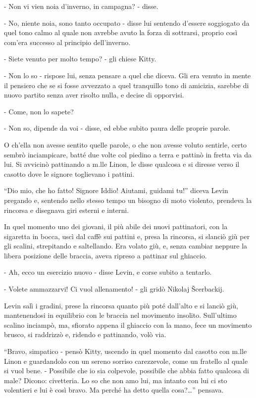- Non vi vien noia d'inverno, in campagna? - disse. 

- No, niente noia, sono tanto occupato - disse lui sentendo d'essere soggiogato da quel tono calmo al quale non avrebbe avuto la forza di sottrarsi, proprio così com'era successo al principio dell'inverno. 

- Siete venuto per molto tempo? - gli chiese Kitty. 

- Non lo so - rispose lui, senza pensare a quel che diceva. Gli era venuto in mente il pensiero che se si fosse avvezzato a quel tranquillo tono di amicizia, sarebbe di nuovo partito senza aver risolto nulla, e decise di opporvisi. 

- Come, non lo sapete? 

- Non so, dipende da voi - disse, ed ebbe subito paura delle proprie parole. 

O ch'ella non avesse sentito quelle parole, o che non avesse voluto sentirle, certo sembrò inciampicare, batté due volte col piedino a terra e pattinò in fretta via da lui. Si avvicinò pattinando a m.lle Linon, le disse qualcosa e si diresse verso il casotto dove le signore toglievano i pattini. 

``Dio mio, che ho fatto! Signore Iddio! Aiutami, guidami tu!'' diceva Levin pregando e, sentendo nello stesso tempo un bisogno di moto violento, prendeva la rincorsa e disegnava giri esterni e interni. 

In quel momento uno dei giovani, il più abile dei nuovi pattinatori, con la sigaretta in bocca, uscì dal caffè sui pattini e, presa la rincorsa, si slanciò giù per gli scalini, strepitando e saltellando. Era volato giù, e, senza cambiar neppure la libera posizione delle braccia, aveva ripreso a pattinar sul ghiaccio. 

- Ah, ecco un esercizio nuovo - disse Levin, e corse subito a tentarlo. 

- Volete ammazzarvi! Ci vuol allenamento! - gli gridò Nikolaj Šcerbackij. 

Levin salì i gradini, prese la rincorsa quanto più poté dall'alto e si lanciò giù, mantenendosi in equilibrio con le braccia nel movimento insolito. Sull'ultimo scalino inciampò, ma, sfiorato appena il ghiaccio con la mano, fece un movimento brusco, si raddrizzò e, ridendo e pattinando, volò via. 

``Bravo, simpatico - pensò Kitty, uscendo in quel momento dal casotto con m.lle Linon e guardandolo con un sereno sorriso carezzevole, come un fratello al quale si vuol bene. - Possibile che io sia colpevole, possibile che abbia fatto qualcosa di male? Dicono: civetteria. Lo so che non amo lui, ma intanto con lui ci sto volentieri e lui è così bravo. Ma perché ha detto quella cosa?\ldots{}'' pensava. 

